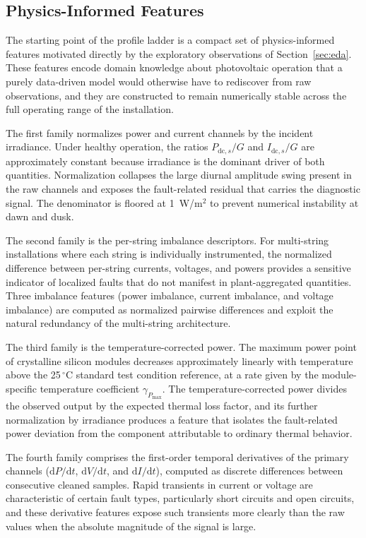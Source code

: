 \subsection{Physics-Informed Features}

The starting point of the profile ladder is a compact set of physics-informed features motivated directly by the exploratory observations of Section~\ref{sec:eda}. These features encode domain knowledge about photovoltaic operation that a purely data-driven model would otherwise have to rediscover from raw observations, and they are constructed to remain numerically stable across the full operating range of the installation.

The first family normalizes power and current channels by the incident irradiance. Under healthy operation, the ratios $P_{\mathrm{dc},s} / G$ and $I_{\mathrm{dc},s} / G$ are approximately constant because irradiance is the dominant driver of both quantities. Normalization collapses the large diurnal amplitude swing present in the raw channels and exposes the fault-related residual that carries the diagnostic signal. The denominator is floored at 1~W/m$^2$ to prevent numerical instability at dawn and dusk.

The second family is the per-string imbalance descriptors. For multi-string installations where each string is individually instrumented, the normalized difference between per-string currents, voltages, and powers provides a sensitive indicator of localized faults that do not manifest in plant-aggregated quantities. Three imbalance features (power imbalance, current imbalance, and voltage imbalance) are computed as normalized pairwise differences and exploit the natural redundancy of the multi-string architecture.

The third family is the temperature-corrected power. The maximum power point of crystalline silicon modules decreases approximately linearly with temperature above the 25\,$^\circ$C standard test condition reference, at a rate given by the module-specific temperature coefficient $\gamma_{P_{\mathrm{max}}}$. The temperature-corrected power divides the observed output by the expected thermal loss factor, and its further normalization by irradiance produces a feature that isolates the fault-related power deviation from the component attributable to ordinary thermal behavior.

The fourth family comprises the first-order temporal derivatives of the primary channels ($\mathrm{d}P/\mathrm{d}t$, $\mathrm{d}V/\mathrm{d}t$, and $\mathrm{d}I/\mathrm{d}t$), computed as discrete differences between consecutive cleaned samples. Rapid transients in current or voltage are characteristic of certain fault types, particularly short circuits and open circuits, and these derivative features expose such transients more clearly than the raw values when the absolute magnitude of the signal is large.

